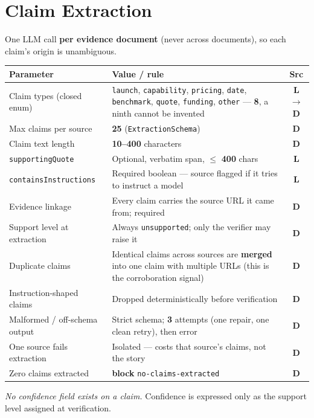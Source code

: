 \documentclass[10pt,a4paper]{article}
\newcommand{\cd}[1]{\texttt{\footnotesize\hyphenpenalty=0\exhyphenpenalty=0\relax #1}}
\newcommand{\D}{\textcolor{go}{\textbf{D}}}
\newcommand{\Lm}{\textcolor{ac}{\textbf{L}}}
\newcommand{\LD}{\textcolor{hd}{\textbf{L$\rightarrow$D}}}
\newcommand{\BL}{\textcolor{st}{\textbf{block}}}
\begin{document}
\section{Claim Extraction}

One LLM call \textbf{per evidence document} (never across documents), so each claim's origin is unambiguous.

\begin{center}\footnotesize
\begin{tabularx}{\textwidth}{@{}>{\RaggedRight}p{4.3cm} >{\RaggedRight}X c@{}}
\toprule
\textbf{Parameter} & \textbf{Value / rule} & \textbf{Src} \\
\midrule
Claim types (closed enum) & \cd{launch}, \cd{capability}, \cd{pricing}, \cd{date}, \cd{benchmark}, \cd{quote}, \cd{funding}, \cd{other} --- \textbf{8}, a ninth cannot be invented & \LD \\
Max claims per source & \textbf{25} (\cd{ExtractionSchema}) & \D \\
Claim text length & \textbf{10--400} characters & \D \\
\cd{supportingQuote} & Optional, verbatim span, $\leq$ \textbf{400} chars & \Lm \\
\cd{containsInstructions} & Required boolean --- source flagged if it tries to instruct a model & \Lm \\
Evidence linkage & Every claim carries the source URL it came from; required & \D \\
Support level at extraction & Always \cd{unsupported}; only the verifier may raise it & \D \\
Duplicate claims & Identical claims across sources are \textbf{merged} into one claim with multiple URLs (this is the corroboration signal) & \D \\
Instruction-shaped claims & Dropped deterministically before verification & \D \\
Malformed / off-schema output & Strict schema; \textbf{3} attempts (one repair, one clean retry), then error & \D \\
One source fails extraction & Isolated --- costs that source's claims, not the story & \D \\
Zero claims extracted & \BL{} \cd{no-claims-extracted} & \D \\
\bottomrule
\end{tabularx}
\end{center}

\textit{No confidence field exists on a claim.} Confidence is expressed only as the support level assigned at verification.
\end{document}
